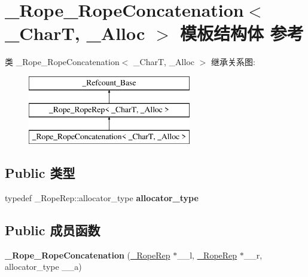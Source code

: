 \hypertarget{struct___rope___rope_concatenation}{}\section{\+\_\+\+Rope\+\_\+\+Rope\+Concatenation$<$ \+\_\+\+CharT, \+\_\+\+Alloc $>$ 模板结构体 参考}
\label{struct___rope___rope_concatenation}
类 \+\_\+\+Rope\+\_\+\+Rope\+Concatenation$<$ \+\_\+\+CharT, \+\_\+\+Alloc $>$ 继承关系图\+:\begin{figure}[H]
\begin{center}
\leavevmode
\includegraphics[height=3.000000cm]{struct___rope___rope_concatenation}
\end{center}
\end{figure}
\subsection*{Public 类型}
\begin{DoxyCompactItemize}
\item 
\mbox{\label{struct___rope___rope_concatenation_ab7616ab34d6018988d05586f7f6b44d4}} 
typedef \+\_\+\+Rope\+Rep\+::allocator\+\_\+type {\bfseries allocator\+\_\+type}
\end{DoxyCompactItemize}
\subsection*{Public 成员函数}
\begin{DoxyCompactItemize}
\item 
\mbox{\label{struct___rope___rope_concatenation_ae3217d47c7b376892ffe6cbc137166d8}} 
{\bfseries \+\_\+\+Rope\+\_\+\+Rope\+Concatenation} (\hyperlink{struct___rope___rope_rep}{\+\_\+\+Rope\+Rep} $\ast$\+\_\+\+\_\+l, \hyperlink{struct___rope___rope_rep}{\+\_\+\+Rope\+Rep} $\ast$\+\_\+\+\_\+r, allocator\+\_\+type \+\_\+\+\_\+a)
\end{DoxyCompactItemize}

